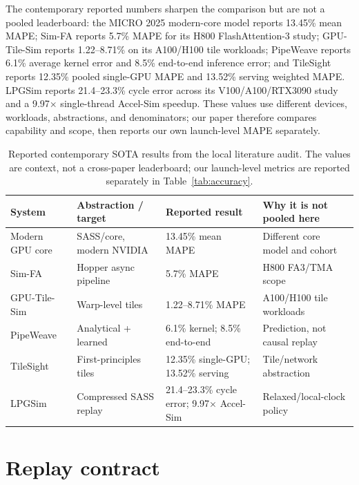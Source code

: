\documentclass[10pt,letterpaper]{article}
\begin{document}
The contemporary reported numbers sharpen the comparison but are not a pooled
leaderboard: the MICRO 2025 modern-core model reports 13.45\% mean MAPE;
Sim-FA reports 5.7\% MAPE for its H800 FlashAttention-3 study;
GPU-Tile-Sim reports 1.22--8.71\% on its A100/H100 tile workloads;
PipeWeave reports 6.1\% average kernel error and 8.5\% end-to-end inference
error; and TileSight reports 12.35\% pooled single-GPU MAPE and 13.52\%
serving weighted MAPE.  LPGSim reports 21.4--23.3\% cycle error across its
V100/A100/RTX3090 study and a 9.97$\times$ single-thread Accel-Sim speedup.
These values use different devices, workloads, abstractions, and denominators;
our paper therefore compares capability and scope, then reports our own
launch-level MAPE separately.

\begin{table}[t]
  \centering
  \caption{Reported contemporary SOTA results from the local literature audit.
  The values are context, not a cross-paper leaderboard; our launch-level
  metrics are reported separately in Table~\ref{tab:accuracy}.}
  \label{tab:sota-reported}
  \small
  \begin{tabularx}{\linewidth}{@{}p{2.2cm}p{3.0cm}p{3.0cm}X@{}}
    \toprule
    System & Abstraction / target & Reported result & Why it is not pooled here\\
    \midrule
    Modern GPU core & SASS/core, modern NVIDIA & 13.45\% mean MAPE & Different core model and cohort\\
    Sim-FA & Hopper async pipeline & 5.7\% MAPE & H800 FA3/TMA scope\\
    GPU-Tile-Sim & Warp-level tiles & 1.22--8.71\% MAPE & A100/H100 tile workloads\\
    PipeWeave & Analytical + learned & 6.1\% kernel; 8.5\% end-to-end & Prediction, not causal replay\\
    TileSight & First-principles tiles & 12.35\% single-GPU; 13.52\% serving & Tile/network abstraction\\
    LPGSim & Compressed SASS replay & 21.4--23.3\% cycle error; 9.97$\times$ Accel-Sim & Relaxed/local-clock policy\\
    \bottomrule
  \end{tabularx}
\end{table}

\section{Replay contract}
\label{sec:contract}
\end{document}
